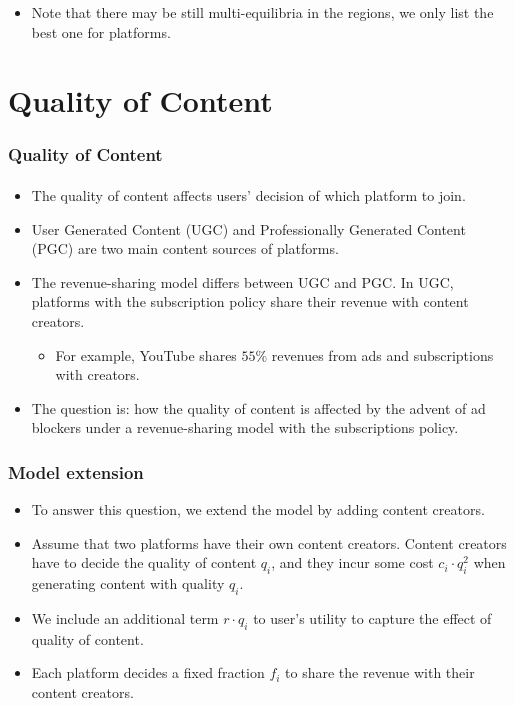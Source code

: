 \documentclass{beamer}
\newcommand{\hl}[1]{\textcolor{myblue}{#1}}
\begin{document}
\begin{frame}
\begin{figure}
\begin{subfigure}[b]{0.3\textwidth}
        \end{subfigure}
    \end{figure}
    \begin{itemize}
        \item Note that there may be still multi-equilibria in the regions,
            we only list the best one for platforms.
    \end{itemize}
\end{frame}



\section{Quality of Content}
\begin{frame}%
    \frametitle{Quality of Content}
    \framesubtitle{}
    \begin{itemize}
        \item The quality of content affects users' decision of which platform to join.
        \item User Generated Content (UGC) and Professionally Generated Content (PGC) are two
            main content sources of platforms.
        \item The revenue-sharing model differs between UGC and PGC. In UGC, platforms
            with the subscription policy share their revenue with content creators.
            \begin{itemize}
                \item For example, YouTube shares $55\%$ revenues from ads and subscriptions with
                    creators.
            \end{itemize}
        \item The question is: how the quality of content is affected by the advent of ad blockers
            under a revenue-sharing model with the subscriptions policy.
    \end{itemize}
\end{frame}

\begin{frame}%
    \frametitle{Model extension}
    \begin{itemize}
        \item To answer this question, we extend the model by \hl{adding content creators}.
        \item Assume that two platforms have their own content creators. Content creators
            have to \hl{decide the quality of content $q_i$}, and they \hl{incur some cost
            $c_i\cdot q_i^2$} when generating content with quality $q_i$.
        \item We include an additional term $r\cdot q_i$ to user's utility to capture the effect
            of quality of content.
        \item Each platform \hl{decides a fixed fraction $f_i$ 
            to share the revenue with their content creators}.
    \end{itemize}
\end{frame}
\end{document}
